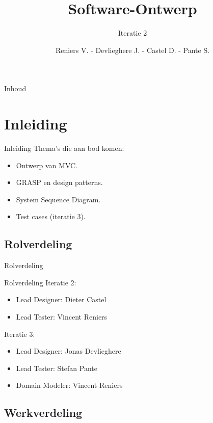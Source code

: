 \documentclass[t]{beamer}
\title{Software-Ontwerp}
\subtitle{Iteratie 2}
\author{Reniers V. - Devlieghere J. - Castel D. - Pante S.}
\institute{KU Leuven}
\begin{document}
\frame{\titlepage} 
\begin{frame}{Inhoud}
\begin{multicols}{2}
\tableofcontents
\end{multicols}
\end{frame}



\section{Inleiding} 
\begin{frame}{Inleiding} 
Thema's die aan bod komen:
\begin{itemize}
	\item Ontwerp van MVC.
	\item GRASP en design patterns.
	\item System Sequence Diagram.
	\item Test cases (iteratie 3).
\end{itemize}
\end{frame}

\subsection{Rolverdeling}
\begin{frame}{Rolverdeling}
\begin{multicols}{2}
\tableofcontents[currentsection]
\end{multicols}
\end{frame}

\begin{frame}{Rolverdeling}
Iteratie 2:
\begin{itemize}
	\item Lead Designer: Dieter Castel
	\item Lead Tester: Vincent Reniers
\end{itemize}

Iteratie 3:
\begin{itemize}
	\item Lead Designer: Jonas Devlieghere
	\item Lead Tester: Stefan Pante
	\item Domain Modeler: Vincent Reniers
\end{itemize}
\end{frame}

\subsection{Werkverdeling}
\end{document}
